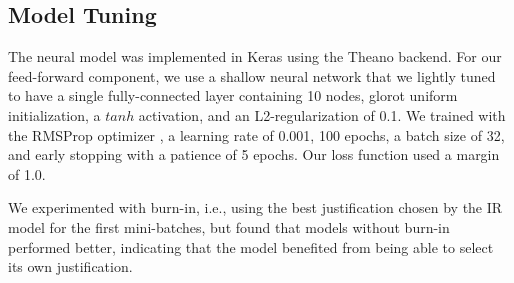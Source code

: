 \subsection{Model Tuning}
The neural model was implemented in Keras \citep{chollet2015keras} using the Theano \citep{2016arXiv160502688short} backend.  For our feed-forward component, we use a shallow neural network that we lightly tuned to have a single fully-connected layer containing 10 nodes, glorot uniform initialization, a $tanh$ activation, and an L2-regularization of 0.1.  We trained with the RMSProp optimizer \citep{rmsprop},  a learning rate of 0.001, 100 epochs, a batch size of 32, and early stopping with a patience of 5 epochs.  Our loss function used a margin of 1.0.  

We experimented with burn-in, i.e., using the best justification chosen by the IR model for the first mini-batches, but found that models without burn-in performed better, indicating that the model benefited from being able to select its own justification.
 